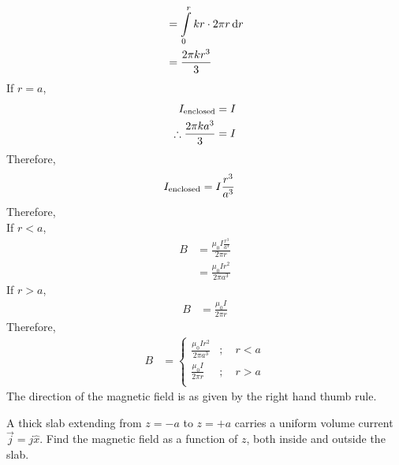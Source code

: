 \documentclass[fleqn, a4paper, 11pt, oneside]{amsart}
\theoremstyle{definition}
\theoremstyle{theorem}
\begin{document}
\begin{solution}
\begin{enumerate}[leftmargin = *]
\begin{align*}
                                                          & = \int\limits_{0}^{r} k r \cdot 2 \pi r \dif r \\
                                                          & = \frac{2 \pi k r^3}{3}
			\end{align*}
			If $r = a$,
			\begin{align*}
				I_{\textnormal{enclosed}}        & = I \\
				\therefore \frac{2 \pi k a^3}{3} & = I
			\end{align*}
			Therefore,
			\begin{align*}
				I_{\textnormal{enclosed}} & = I \frac{r^3}{a^3}
			\end{align*}
			Therefore,\\
			If $r < a$,
			\begin{align*}
				B & = \frac{\mu_0 I \frac{r^3}{a^3}}{2 \pi r} \\
                                  & = \frac{\mu_0 I r^2}{2 \pi a^3}
			\end{align*}
			If $r > a$,
			\begin{align*}
				B & = \frac{\mu_0 I}{2 \pi r}
			\end{align*}
			Therefore,
			\begin{align*}
				B &=
					\begin{cases}
						\frac{\mu_0 I r^2}{2 \pi a^3} & ;\quad r < a \\
						\frac{\mu_0 I}{2 \pi r}       & ;\quad r > a \\
					\end{cases}
			\end{align*}
			The direction of the magnetic field is as given by the right hand thumb rule.
	\end{enumerate}
\end{solution}

\begin{question}
	A thick slab extending from $z = -a$ to $z = +a$ carries a uniform volume current $\overrightarrow{j} = j \hat{x}$.
	Find the magnetic field as a function of $z$, both inside and outside the slab.
\end{question}
\end{document}
